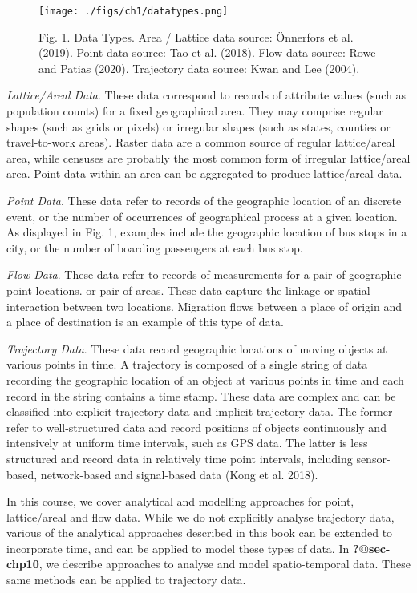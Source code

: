 \documentclass[
  letterpaper,
  krantz2]{style/krantz}
\begin{document}
\begin{figure}

{\centering \texttt{[image: ./figs/ch1/datatypes.png]}

}

\caption{Fig. 1. Data Types. Area / Lattice data source: Önnerfors et
al. (2019). Point data source: Tao et al. (2018). Flow data source: Rowe
and Patias (2020). Trajectory data source: Kwan and Lee (2004).}

\end{figure}

\emph{Lattice/Areal Data}. These data correspond to records of attribute
values (such as population counts) for a fixed geographical area. They
may comprise regular shapes (such as grids or pixels) or irregular
shapes (such as states, counties or travel-to-work areas). Raster data
are a common source of regular lattice/areal area, while censuses are
probably the most common form of irregular lattice/areal area. Point
data within an area can be aggregated to produce lattice/areal data.

\emph{Point Data}. These data refer to records of the geographic
location of an discrete event, or the number of occurrences of
geographical process at a given location. As displayed in Fig. 1,
examples include the geographic location of bus stops in a city, or the
number of boarding passengers at each bus stop.

\emph{Flow Data}. These data refer to records of measurements for a pair
of geographic point locations. or pair of areas. These data capture the
linkage or spatial interaction between two locations. Migration flows
between a place of origin and a place of destination is an example of
this type of data.

\emph{Trajectory Data}. These data record geographic locations of moving
objects at various points in time. A trajectory is composed of a single
string of data recording the geographic location of an object at various
points in time and each record in the string contains a time stamp.
These data are complex and can be classified into explicit trajectory
data and implicit trajectory data. The former refer to well-structured
data and record positions of objects continuously and intensively at
uniform time intervals, such as GPS data. The latter is less structured
and record data in relatively time point intervals, including
sensor-based, network-based and signal-based data (Kong et al. 2018).

In this course, we cover analytical and modelling approaches for point,
lattice/areal and flow data. While we do not explicitly analyse
trajectory data, various of the analytical approaches described in this
book can be extended to incorporate time, and can be applied to model
these types of data. In \textbf{?@sec-chp10}, we describe approaches to
analyse and model spatio-temporal data. These same methods can be
applied to trajectory data.
\end{document}
